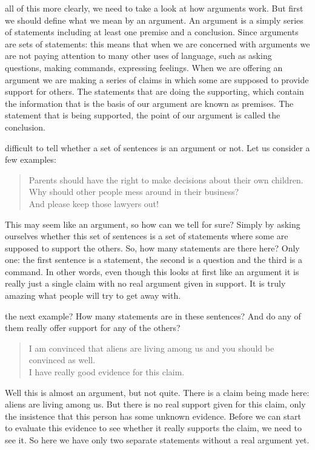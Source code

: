 \documentclass[justified]{tufte-book}
\newenvironment{argument}{\begin{quote}\normalsize}{\end{quote}}
\begin{document}
 all of this more clearly, we need to take a look at how arguments work. But first we should define what we mean by an argument. An argument is a simply series of statements including at least one premise and a conclusion. Since arguments are sets of statements: this means that when we are concerned with arguments we are not paying attention to many other uses of language, such as asking questions, making commands, expressing feelings. When we are offering an argument we are making a series of claims in which some are supposed to provide support for others. The statements that are doing the supporting, which contain the information that is the basis of our argument are known as premises. The statement that is being supported, the point of our argument is called the conclusion.

 difficult to tell whether a set of sentences is an argument or not. Let us consider a few examples:

\begin{argument}
Parents should have the right to make decisions about their own
children.\\
Why should other people mess around in their business?\\
And please keep those lawyers out!
\end{argument}

This may seem like an argument, so how can we tell for sure? Simply by asking ourselves whether this set of sentences is a set of statements where some are supposed to support the others. So, how many statements are there here? Only one: the first sentence is a statement, the second is a question and the third is a command. In other words, even though this looks at first like an argument it is really just a single claim with no real argument given in support. It is truly amazing what people will try to get away with.

 the next example? How many statements are in these sentences? And do any of them really offer support for any of the others?

\begin{argument}
I am convinced that aliens are living among us and you should be
convinced as well.\\
I have really good evidence for this claim.
\end{argument}

Well this is almost an argument, but not quite. There is a claim being made here: aliens are living among us. But there is no real support given for this claim, only the insistence that this person has some unknown evidence. Before we can start to evaluate this evidence to see whether it really supports the claim, we need to see it. So here we have only two separate statements without a real argument yet.
\end{document}
